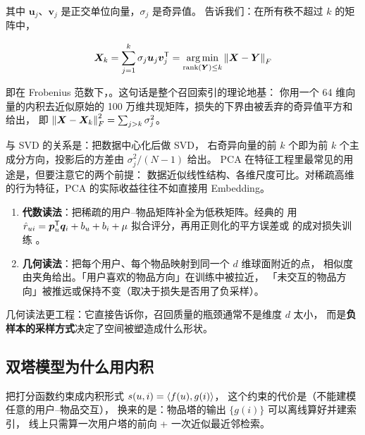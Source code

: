 其中 $\bm{u}_j$、$\bm{v}_j$ 是正交单位向量，$\sigma_j$ 是奇异值。
 告诉我们：在所有秩不超过 $k$ 的矩阵中，

\begin{equation}
\bm{X}_k = \sum_{j=1}^{k} \sigma_j \bm{u}_j \bm{v}_j^{\mathsf{T}}
= \operatorname*{arg\,min}_{\text{rank}(\bm{Y}) \le k} \left\lVert \bm{X} - \bm{Y} \right\rVert_F
\label{eq:svd-lowrank}
\end{equation}

即在 Frobenius 范数下，。这句话是整个召回索引的理论地基：
你用一个 64 维向量的内积去近似原始的 100 万维共现矩阵，损失的下界由被丢弃的奇异值平方和给出，
即 $\left\lVert \bm{X} - \bm{X}_k \right\rVert_F^2 = \sum_{j>k}\sigma_j^2$。

 与 SVD 的关系是：把数据中心化后做 SVD，
右奇异向量的前 $k$ 个即为前 $k$ 个主成分方向，投影后的方差由 $\sigma_j^2/(N-1)$ 给出。
PCA 在特征工程里最常见的用途是，但要注意它的两个前提：
数据近似线性结构、各维尺度可比。对稀疏高维的行为特征，PCA 的实际收益往往不如直接用 Embedding。

\begin{formulacard}[矩阵分解的两种读法]
\begin{enumerate}
  \item \textbf{代数读法}：把稀疏的用户--物品矩阵补全为低秩矩阵。经典的
         用 $\hat{r}_{ui} = \bm{p}_u^{\mathsf{T}} \bm{q}_i + b_u + b_i + \mu$
        拟合评分，再用正则化的平方误差或  的成对损失训练
        \cite{koren2009mf,rendle2009bpr}。
  \item \textbf{几何读法}：把每个用户、每个物品映射到同一个 $d$ 维球面附近的点，
        相似度由夹角给出。「用户喜欢的物品方向」在训练中被拉近，
        「未交互的物品方向」被推远或保持不变（取决于损失是否用了负采样）。
\end{enumerate}
几何读法更工程：它直接告诉你，召回质量的瓶颈通常不是维度 $d$ 太小，
而是\textbf{负样本的采样方式}决定了空间被塑造成什么形状。
\end{formulacard}

\subsection{双塔模型为什么用内积}

 把打分函数约束成内积形式 $s(u,i) = \left\langle f(u), g(i) \right\rangle$，
这个约束的代价是（不能建模任意的用户--物品交互），
换来的是：物品塔的输出 $\{g(i)\}$ 可以离线算好并建索引，
线上只需算一次用户塔的前向 + 一次近似最近邻检索。


